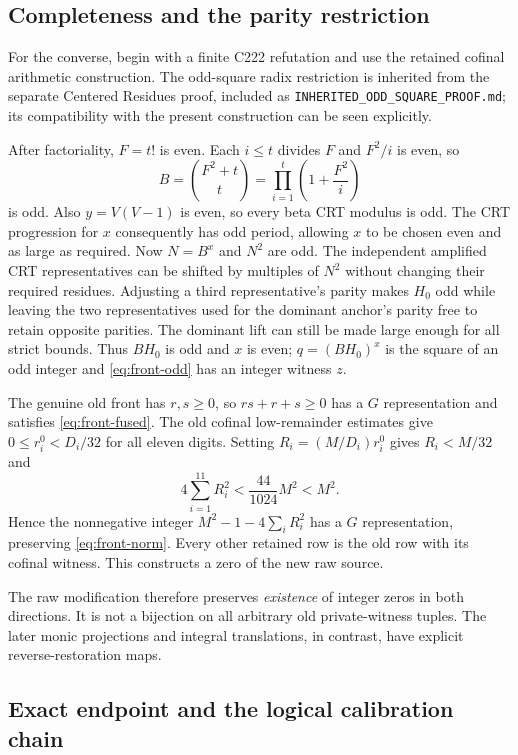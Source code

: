 \documentclass[11pt,letterpaper]{article}
\theoremstyle{definition}
\theoremstyle{remark}
\begin{document}
\subsection{Completeness and the parity restriction}

For the converse, begin with a finite C222 refutation and use the
retained cofinal arithmetic construction.  The odd-square radix
restriction is inherited from the separate Centered Residues proof,
included as \texttt{INHERITED\_ODD\_SQUARE\_PROOF.md}; its compatibility
with the present construction can be seen explicitly.

After factoriality, $F=t!$ is even.  Each $i\leq t$ divides $F$ and
$F^2/i$ is even, so
\[
 B=\binom{F^2+t}{t}=\prod_{i=1}^t\left(1+\frac{F^2}{i}\right)
\]
is odd.  Also $y=V(V-1)$ is even, so every beta CRT modulus is odd.
The CRT progression for $x$ consequently has odd period, allowing $x$
to be chosen even and as large as required.  Now $N=B^x$ and $N^2$
are odd.  The independent amplified CRT representatives can be shifted
by multiples of $N^2$ without changing their required residues.
Adjusting a third representative's parity makes $H_0$ odd while leaving
the two representatives used for the dominant anchor's parity free to
retain opposite parities.  The dominant lift can still be made large
enough for all strict bounds.  Thus $BH_0$ is odd and $x$ is even;
$q=(BH_0)^x$ is the square of an odd integer and
\eqref{eq:front-odd} has an integer witness $z$.

The genuine old front has $r,s\geq0$, so $rs+r+s\geq0$ has a
$G$ representation and satisfies \eqref{eq:front-fused}.  The old
cofinal low-remainder estimates give $0\leq r_i^0<D_i/32$ for all
eleven digits.  Setting $R_i=(M/D_i)r_i^0$ gives $R_i<M/32$ and
\[
 4\sum_{i=1}^{11}R_i^2
 <\frac{44}{1024}M^2<M^2.
\]
Hence the nonnegative integer
$M^2-1-4\sum_iR_i^2$ has a $G$ representation, preserving
\eqref{eq:front-norm}.  Every other retained row is the old row with
its cofinal witness.  This constructs a zero of the new raw source.

The raw modification therefore preserves \emph{existence} of integer
zeros in both directions.  It is not a bijection on all arbitrary old
private-witness tuples.  The later monic projections and integral
translations, in contrast, have explicit reverse-restoration maps.

\subsection{Exact endpoint and the logical calibration chain}
\end{document}
